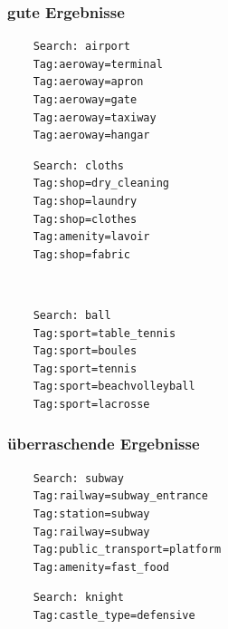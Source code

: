 \documentclass[12pt,pdftex,a4paper]{article}
\begin{document}
\subsubsection{gute Ergebnisse}
\begin{minipage}[t]{0.45\linewidth}
\begin{lstlisting}
	Search: airport
	Tag:aeroway=terminal
	Tag:aeroway=apron
	Tag:aeroway=gate
	Tag:aeroway=taxiway
	Tag:aeroway=hangar
\end{lstlisting}
\end{minipage}
\begin{minipage}[t]{0.45\linewidth}
\begin{lstlisting}
	Search: cloths
	Tag:shop=dry_cleaning
	Tag:shop=laundry
	Tag:shop=clothes
	Tag:amenity=lavoir
	Tag:shop=fabric
\end{lstlisting}
\end{minipage}
\\
\begin{minipage}[t]{0.45\linewidth}
	\begin{lstlisting}
	Search: ball
	Tag:sport=table_tennis
	Tag:sport=boules
	Tag:sport=tennis
	Tag:sport=beachvolleyball
	Tag:sport=lacrosse
	\end{lstlisting}
\end{minipage}

\subsubsection{überraschende Ergebnisse}
\begin{minipage}[t]{0.45\linewidth}
\begin{lstlisting}
	Search: subway
	Tag:railway=subway_entrance
	Tag:station=subway
	Tag:railway=subway
	Tag:public_transport=platform
	Tag:amenity=fast_food
\end{lstlisting}
\end{minipage}
\begin{minipage}[t]{0.45\linewidth}
\begin{lstlisting}
	Search: knight
	Tag:castle_type=defensive
\end{lstlisting}
\end{minipage}
\end{document}
